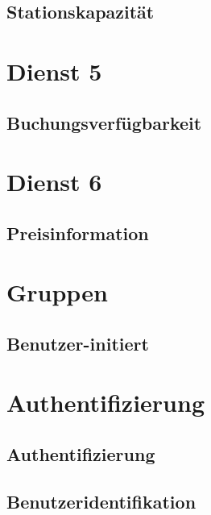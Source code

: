 \subsection*{Stationskapazität}



\section{Dienst 5}
\label{subsec:Datenmodell:Dienst5}

\subsection*{Buchungsverfügbarkeit}



\section{Dienst 6}
\label{subsec:Datenmodell:Dienst6}

\subsection*{Preisinformation}


\section{Gruppen}

\subsection*{Benutzer-initiert}



\section{Authentifizierung}
\subsection*{Authentifizierung}


\subsection*{Benutzeridentifikation}


